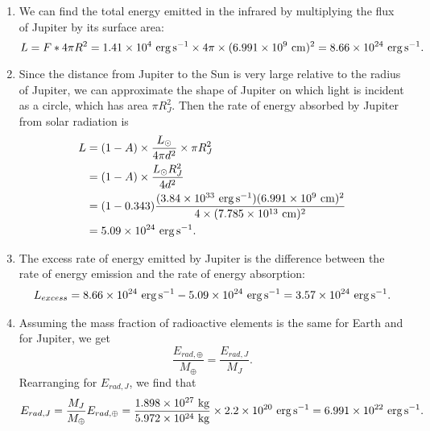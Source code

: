 \documentclass[11pt,letterpaper]{article}
\begin{document}
\begin{enumerate}[label=(\alph*)]
    
    \item We can find the total energy emitted in the infrared by multiplying the flux of Jupiter by its surface area:
        \begin{equation*}
            L = F*4\pi R^2 = 1.41\times 10^{4}~{\rm erg\,s^{-1}}\times 4\pi\times (6.991 \times 10^{9}~{\rm cm})^2 = 8.66\times 10^{24}~{\rm erg\,s^{-1}}.
        \end{equation*}
   
    \item Since the distance from Jupiter to the Sun is very large relative to the radius of Jupiter, we can approximate the shape of Jupiter on which light is incident as a circle, which has area $\pi R_J^2.$ Then the rate of energy absorbed by Jupiter from solar radiation is 
    \begin{align*}
        L &= (1-A)\times \frac{L_\odot}{4\pi d^2}\times \pi R_J^2 \\
          &= (1-A)\times \frac{L_\odot R_J^2}{4d^2} \\
          &= (1-0.343)\frac{(3.84 \times 10^{33}~{\rm erg\,s^{-1}}) (6.991 \times 10^{9}~{\rm cm})^2}{4\times (7.785 \times 10^{13}~{\rm cm})^2} \\
          &= 5.09\times 10^{24}~{\rm erg\,s^{-1}}.
    \end{align*}
    
    \item The excess rate of energy emitted by Jupiter is the difference between the rate of energy emission and the rate of energy absorption: 
        \begin{align*}
            L_{excess} = 8.66\times 10^{24}~{\rm erg\,s^{-1}} - 5.09\times 10^{24}~{\rm erg\,s^{-1}} = 3.57\times 10^{24}~{\rm erg\,s^{-1}}.
        \end{align*}

    \item Assuming the mass fraction of radioactive elements is the same for Earth and for Jupiter, we get        
        \begin{equation*}
            \frac{E_{rad, \oplus}}{M_\oplus} = \frac{E_{rad, J}}{M_J}.
        \end{equation*}
        Rearranging for $E_{rad, J}$, we find that 
        \begin{equation*}
            E_{rad, J} = \frac{M_J}{M_\oplus}E_{rad, \oplus}
                       = \frac{1.898\times 10^{27}~{\rm kg}}{5.972\times 10^{24}~{\rm kg}}\times 2.2\times 10^{20}~{\rm erg\,s^{-1}} 
                       = 6.991 \times 10^{22}~{\rm erg\,s^{-1}}.
        \end{equation*}



\end{enumerate}
\end{document}
